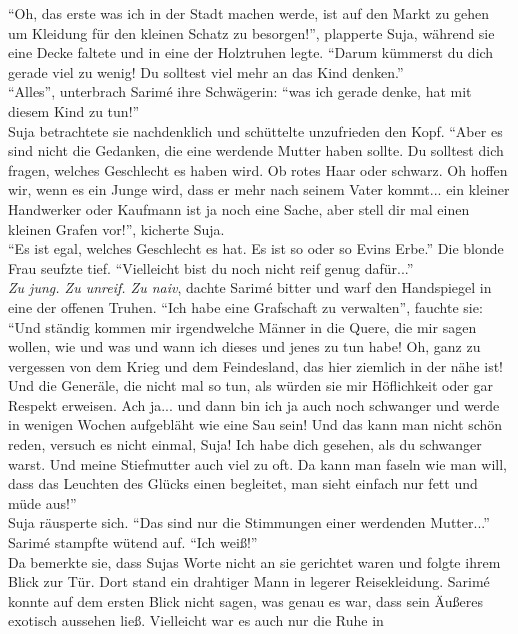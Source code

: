 ``Oh, das erste was ich in der Stadt machen werde, ist auf den Markt zu gehen um Kleidung für den 
kleinen Schatz zu besorgen!'', plapperte Suja, während sie eine Decke faltete und in eine der 
Holztruhen legte. ``Darum kümmerst du dich gerade viel zu wenig! Du solltest viel mehr an das Kind 
denken.''\\
``Alles'', unterbrach Sarimé ihre Schwägerin: ``was ich gerade denke, hat mit diesem Kind zu 
tun!''\\
Suja betrachtete sie nachdenklich und schüttelte unzufrieden den Kopf. ``Aber es sind nicht die 
Gedanken, die eine werdende Mutter haben sollte. Du solltest dich fragen, welches Geschlecht es 
haben wird. Ob rotes Haar oder schwarz. Oh hoffen wir, wenn es ein Junge wird, dass er mehr nach 
seinem Vater kommt... ein kleiner Handwerker oder Kaufmann ist ja noch eine Sache, aber stell dir 
mal einen kleinen Grafen vor!'', kicherte Suja.\\
``Es ist egal, welches Geschlecht es hat. Es ist so oder so Evins Erbe.''
Die blonde Frau seufzte tief. ``Vielleicht bist du noch nicht reif genug dafür...''\\
\textit{Zu jung. Zu unreif. Zu naiv}, dachte Sarimé bitter und warf den Handspiegel in eine der 
offenen Truhen. ``Ich habe eine Grafschaft zu verwalten'', fauchte sie: ``Und ständig kommen mir 
irgendwelche Männer in die Quere, die mir sagen wollen, wie und was und wann ich dieses und jenes 
zu tun habe! Oh, ganz zu vergessen von dem Krieg und dem Feindesland, das hier ziemlich in der nähe 
ist! Und die Generäle, die nicht mal so tun, als würden sie mir Höflichkeit oder gar Respekt 
erweisen. Ach ja... und dann bin ich ja auch noch schwanger und werde in wenigen Wochen aufgebläht 
wie eine Sau sein! Und das kann man nicht schön reden, versuch es nicht einmal, Suja! Ich habe dich 
gesehen, als du schwanger warst. Und meine Stiefmutter auch viel zu oft. Da kann man faseln wie man 
will, dass das Leuchten des Glücks einen begleitet, man sieht einfach nur fett und müde aus!''\\
Suja räusperte sich. ``Das sind nur die Stimmungen einer werdenden Mutter...''\\
Sarimé stampfte wütend auf. ``Ich weiß!''\\
Da bemerkte sie, dass Sujas Worte nicht an sie gerichtet waren und folgte ihrem Blick zur Tür. Dort 
stand ein drahtiger Mann in legerer Reisekleidung. Sarimé konnte auf dem ersten Blick nicht sagen, 
was genau es war, dass sein Äußeres exotisch aussehen ließ. Vielleicht war es auch nur die Ruhe in 
